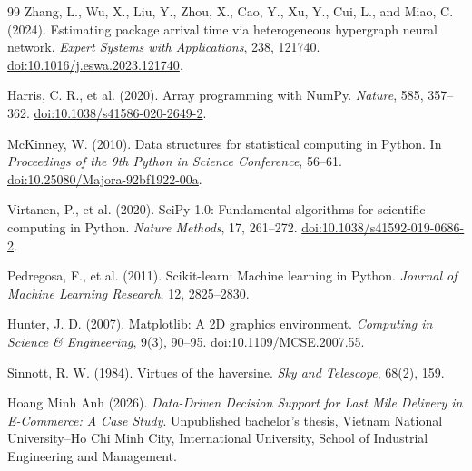 \documentclass[11pt,a4paper]{article}
\begin{document}
\begin{thebibliography}{99}
Zhang, L., Wu, X., Liu, Y., Zhou, X., Cao, Y., Xu, Y., Cui, L., and Miao, C. (2024).
Estimating package arrival time via heterogeneous hypergraph neural network.
\emph{Expert Systems with Applications}, 238, 121740.
\href{https://doi.org/10.1016/j.eswa.2023.121740}{doi:10.1016/j.eswa.2023.121740}.

Harris, C. R., et al. (2020).
Array programming with NumPy.
\emph{Nature}, 585, 357--362.
\href{https://doi.org/10.1038/s41586-020-2649-2}{doi:10.1038/s41586-020-2649-2}.

McKinney, W. (2010).
Data structures for statistical computing in Python.
In \emph{Proceedings of the 9th Python in Science Conference}, 56--61.
\href{https://doi.org/10.25080/Majora-92bf1922-00a}{doi:10.25080/Majora-92bf1922-00a}.

Virtanen, P., et al. (2020).
SciPy 1.0: Fundamental algorithms for scientific computing in Python.
\emph{Nature Methods}, 17, 261--272.
\href{https://doi.org/10.1038/s41592-019-0686-2}{doi:10.1038/s41592-019-0686-2}.

Pedregosa, F., et al. (2011).
Scikit-learn: Machine learning in Python.
\emph{Journal of Machine Learning Research}, 12, 2825--2830.

Hunter, J. D. (2007).
Matplotlib: A 2D graphics environment.
\emph{Computing in Science \& Engineering}, 9(3), 90--95.
\href{https://doi.org/10.1109/MCSE.2007.55}{doi:10.1109/MCSE.2007.55}.

Sinnott, R. W. (1984).
Virtues of the haversine.
\emph{Sky and Telescope}, 68(2), 159.

Hoang Minh Anh (2026).
\emph{Data-Driven Decision Support for Last Mile Delivery in E-Commerce: A Case Study}.
Unpublished bachelor's thesis, Vietnam National University--Ho Chi Minh City, International University, School of Industrial Engineering and Management.

\end{thebibliography}
\end{document}
